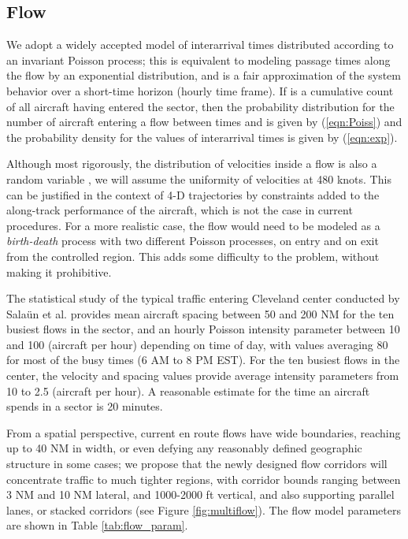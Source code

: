 \documentclass[conference]{IEEEtran}
\begin{document}
\subsection{Flow}
We adopt a widely accepted model of interarrival times distributed according to an invariant Poisson process; this is equivalent to modeling passage times along the flow by an exponential distribution, and is a fair approximation of the system behavior over a short-time horizon (hourly time frame). If  is a cumulative count of all aircraft having entered the sector, then the probability distribution for the number of aircraft entering a flow between times  and  is given by (\ref{eqn:Poiss}) and the probability density for the values of interarrival times  is given by (\ref{eqn:exp}).




Although most rigorously, the distribution of velocities inside a flow is also a random variable \cite{Sal11}, we will assume the uniformity of velocities at 480 knots. This can be justified in the context of 4-D trajectories by constraints added to the along-track performance of the aircraft, which is not the case in current procedures. For a more realistic case, the flow would need to be modeled as a \emph{birth-death} process with two different Poisson processes, on entry and on exit from the controlled region. This adds some difficulty to the problem, without making it prohibitive.

The statistical study of the typical traffic entering Cleveland center conducted by Sala\"{u}n et al. \cite{Sal10} provides mean aircraft spacing between 50 and 200 NM for the ten busiest flows in the sector, and an hourly Poisson intensity parameter  between 10 and 100 (aircraft per hour) depending on time of day, with values averaging 80 for most of the busy times (6 AM to 8 PM EST). For the ten busiest flows in the center, the velocity and spacing values provide average intensity parameters  from 10 to 2.5 (aircraft per hour). A reasonable estimate for the time an aircraft spends in a sector is 20 minutes.

From a spatial perspective, current en route flows have wide boundaries, reaching up to 40 NM in width, or even defying any reasonably defined geographic structure in some cases; we propose that the newly designed flow corridors will concentrate traffic to much tighter regions, with corridor bounds ranging between 3 NM and 10 NM lateral, and 1000-2000 ft vertical, and also supporting parallel lanes, or stacked corridors (see Figure \ref{fig:multiflow}). The flow model parameters are shown in Table \ref{tab:flow_param}.
\end{document}
